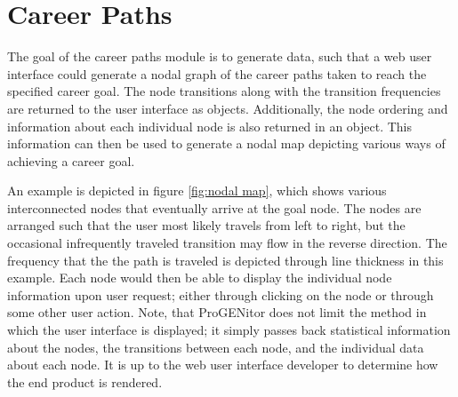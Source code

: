 \section{Career Paths}
\label{sect:career-paths}
The goal of the career paths module is to generate data, such that a web user
interface could generate a nodal graph of the career paths taken to reach the
specified career goal.  The node transitions along with the transition
frequencies are returned to the user interface as objects.  Additionally,
the node ordering and information about each individual node is also returned in
an object.  This information can then be used to generate a nodal map
depicting various ways of achieving a career goal.  

An example is depicted in figure \ref{fig:nodal map}, which shows various
interconnected nodes that eventually arrive at the goal node.  The nodes are
arranged such that the user most likely travels from left to right, but the
occasional infrequently traveled transition may flow in the reverse direction. 
The frequency that the the path is traveled is depicted through line thickness
in this example.  Each node would then be able to display the individual node
information upon user request; either through clicking on the node or through
some other user action.  Note, that ProGENitor does not limit the method in
which the user interface is displayed; it simply passes back statistical
information about the nodes, the transitions between each node, and the
individual data about each node.  It is up to the web user interface developer
to determine how the end product is rendered.


\usetikzlibrary{shapes,arrows,chains}

